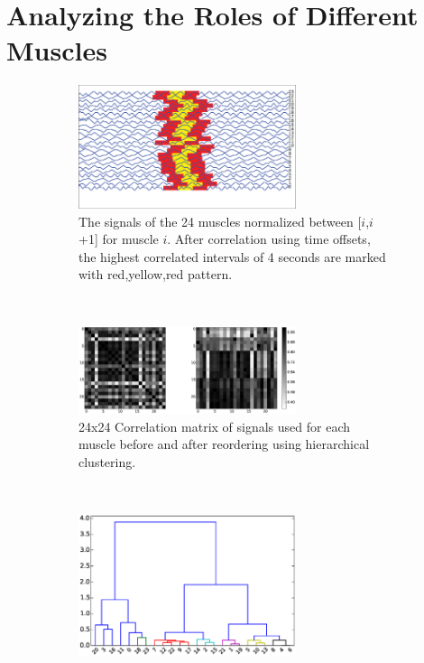 \documentclass[twocolumn,10pt]{asme2ej}
\begin{document}
\section{Analyzing the Roles of Different Muscles}
\label{sec:signals}



\begin{figure}
        \centering
        \begin{subfigure}[b]{\columnwidth}
        		\centering
                \includegraphics[width=0.7\textwidth]{results/signals/aligned1.eps}
                \caption{The signals of the 24 muscles normalized between [$i$,$i$+1] for muscle $i$. After correlation using time offsets, the highest correlated intervals of 4 seconds are  marked with red,yellow,red pattern. }
				\label{fig:aligned1}
        \end{subfigure}\\
         \begin{subfigure}[b]{\columnwidth}
        		\centering
               \includegraphics[width=0.7\textwidth]{results/signals/correlation.eps}
                \caption{24x24 Correlation matrix of signals used for each muscle before and after reordering using hierarchical clustering. }
				\label{fig:correlation}
        \end{subfigure}\\
        \begin{subfigure}[b]{\columnwidth}
        		\centering
                \includegraphics[width=0.7\textwidth]{results/signals/clustering.eps}

\end{subfigure}
\end{figure}
\end{document}
